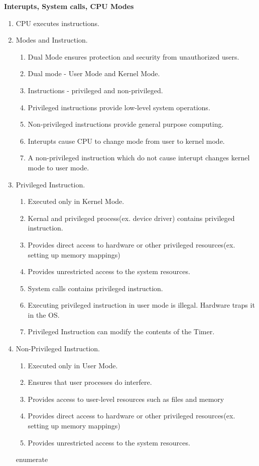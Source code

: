 
\centerline{\textbf{ \LARGE Interupts, System calls, CPU Modes}}




  \begin{enumerate}

  \item CPU executes instructions.

  \item Modes and Instruction.
  \begin{enumerate}
        \item Dual Mode ensures protection and security from unauthorized users.
        \item Dual mode - User Mode and Kernel Mode.
        \item Instructions - privileged and non-privileged.
        \item Privileged instructions provide low-level system operations.
        \item Non-privileged instructions provide general purpose computing.
        \item Interupts cause CPU to change mode from user to kernel mode.
        \item A non-privileged instruction which do not cause interupt changes kernel mode to user mode.
  \end{enumerate}

  \item Privileged Instruction.
  \begin{enumerate}
        \item Executed only in Kernel Mode.
        \item Kernal and privileged process(ex. device driver) contains privileged instruction.
        \item Provides direct access to hardware or other privileged resources(ex. setting up memory mappings)
        \item Provides unrestricted access to the system resources.
        \item System calls contains privileged instruction.
        \item Executing privileged instruction in user mode is illegal. Hardware traps it in the OS.
        \item Privileged Instruction can modify the contents of the Timer.
  \end{enumerate}

  \item Non-Privileged Instruction.
  \begin{enumerate}
        \item Executed only in User Mode.
        \item Ensures that user processes do interfere.
        \item Provides access to user-level resources such as files and memory
        \item Provides direct access to hardware or other privileged resources(ex. setting up memory mappings)
        \item Provides unrestricted access to the system resources.
  \end{enumerate}{enumerate}


\end{enumerate}

